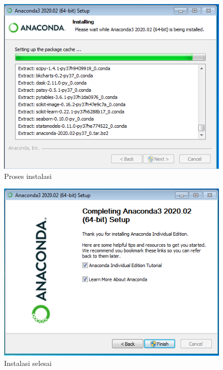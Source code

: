 \begin{figure}[h!]
  \begin{center}
    \includegraphics[scale=.5]{pics/anacondaInstall6.png}
    \caption{Proses instalasi}
    \label{fig:prosesInstalasi}
  \end{center}
\end{figure}

\begin{figure}[h!]
  \begin{center}
    \includegraphics[scale=.5]{pics/anacondaInstall9.png}
    \caption{Instalasi selesai}
    \label{fig:instalasiEnd}
  \end{center}
\end{figure}

